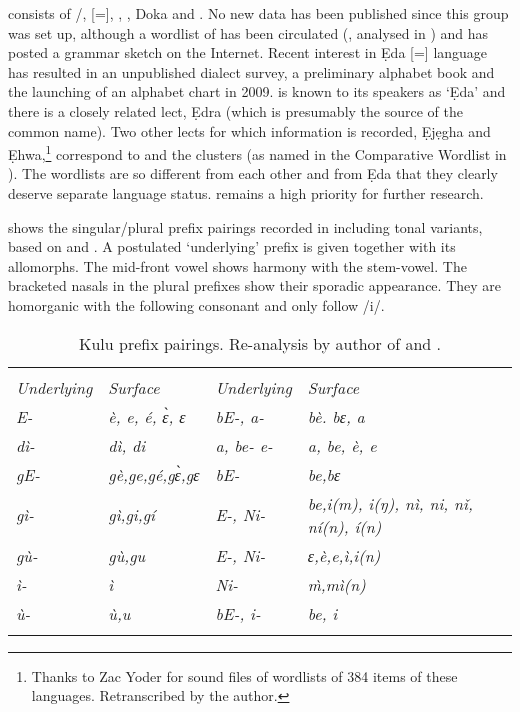 \documentclass[output=paper]{langsci/langscibook}
\begin{document}
 consists of /,  [=], , , Do\-ka and . No new data has been published since this group was set up, although a wordlist of  has been circulated (\citealt{Moser1982}, analysed in \citealt{Seitz1993}) and \citet{Shimizu1996} has posted a grammar sketch on the Internet. Recent interest in Ẹda [=] language has resulted in an unpublished dialect survey, a preliminary alphabet book and the launching of an alphabet chart in 2009.  is known to its speakers as ‘Ẹda’ and there is a closely related lect, Ẹdra (which is presumably the source of the common  name). Two other lects for which information is recorded, Ẹjẹgha and Ẹhwa,\footnote{Thanks to Zac Yoder for sound files of wordlists of 384 items of these languages. Retranscribed by the author.} correspond to  and the  clusters (as named in the  Comparative Wordlist in \citealt{WilliamsonShimizu1968,Williamson1972}). The wordlists are so different from each other and from Ẹda that they clearly deserve separate language status.  remains a high priority for further research.

 shows the singular/plural prefix pairings recorded in  including tonal variants, based on \citet{Moser1982} and \citet{Seitz1993}. A postulated ‘underlying’ prefix is given together with its allomorphs. The mid-front vowel shows harmony with the stem-vowel. The bracketed nasals in the plural prefixes show their sporadic appearance. They are homorganic with the following consonant and only follow /i/.
 
\begin{table}
\caption{Kulu prefix pairings. Re-analysis by author of \citet{Moser1982} and \citet{Shimizu1996}.}
\label{tab:nomaffplat:2}
\begin{tabular}{>{\itshape}l>{\itshape}l@{\qquad}>{\itshape}l>{\itshape}l}
\lsptoprule
\multicolumn{2}{p{4cm}}{\centering Singular} 	&\multicolumn{2}{p{3cm}}{\centering Plural}\\
\upshape Underlying  	& \upshape   Surface    	& \upshape Underlying  	& \upshape  Surface\\
\midrule 
E- 	&   è, e, é, ɛ̀, ɛ   	& bE-, a-    	& bè. bɛ, a        \\
dì-	&    dì, di         	&  a, be- e- 	&   a, be, è, e    \\
gE-	&    gè,ge,gé,gɛ̀,gɛ 	& bE-        	&  be,bɛ           \\
gì-	&    gì,gi,gí       	&  E-, Ni-   	&  be,i(m),  i(ŋ), nì,  ni, nǐ, ní(n), í(n)\\
gù-	&    gù,gu	&      E-, Ni- 	&   ɛ,è,e,ì,i(n)    \\
ì- 	&   ì     	& Ni-          	&   m̀,mì(n)     \\
ù- 	&   ù,u   	&   bE-, i-    	&  be, i            \\
\lspbottomrule
\end{tabular}
\end{table}
\end{document}
